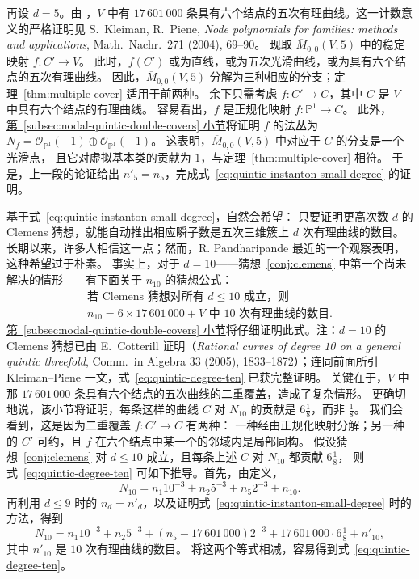 \begin{example}
再设 $d=5$。由 ，$V$ 中有 $17\,601\,000$ 条具有六个结点的五次有理曲线。这一计数意义的严格证明见 S.~Kleiman, R.~Piene, \emph{Node polynomials for families: methods and applications}, Math.\ Nachr.\ 271 (2004), 69--90。
现取 $\overline M_{0,0}(V,5)$ 中的稳定映射 $f:C'\to V$。
此时，$f(C')$ 或为直线，或为五次光滑曲线，或为具有六个结点的五次有理曲线。
因此，$\overline M_{0,0}(V,5)$ 分解为三种相应的分支；定理~\ref{thm:multiple-cover} 适用于前两种。
余下只需考虑 $f:C'\to C$，其中 $C$ 是 $V$ 中具有六个结点的有理曲线。
容易看出，$f$ 是正规化映射 $f:\mathbb P^1\to C$。
此外，\hyperref[subsec:nodal-quintic-double-covers]{第~\ref*{subsec:nodal-quintic-double-covers} 小节}将证明 $f$ 的法丛为
$N_f=\mathcal O_{\mathbb P^1}(-1)\oplus\mathcal O_{\mathbb P^1}(-1)$。
这表明，$\overline M_{0,0}(V,5)$ 中对应于 $C$ 的分支是一个光滑点，
且它对虚拟基本类的贡献为 $1$，与定理~\ref{thm:multiple-cover} 相符。
于是，上一段的论证给出 $n'_5=n_5$，完成式~\eqref{eq:quintic-instanton-small-degree} 的证明。

基于式~\eqref{eq:quintic-instanton-small-degree}，自然会希望：
只要证明更高次数 $d$ 的 Clemens 猜想，就能自动推出相应瞬子数是五次三维簇上 $d$ 次有理曲线的数目。
长期以来，许多人相信这一点；然而，R. Pandharipande 最近的一个观察表明，这种希望过于朴素。
事实上，对于 $d=10$——猜想~\ref{conj:clemens} 中第一个尚未解决的情形——有下面关于 $n_{10}$ 的猜想公式：
\begin{equation}\label{eq:quintic-degree-ten}
\begin{gathered}
\text{若 Clemens 猜想对所有 }d\leq10\text{ 成立，则}\\
n_{10}=6\times17\,601\,000+V\text{ 中 }10\text{ 次有理曲线的数目}.
\end{gathered}
\end{equation}
\hyperref[subsec:nodal-quintic-double-covers]{第~\ref*{subsec:nodal-quintic-double-covers} 小节}将仔细证明此式。注：$d=10$ 的 Clemens 猜想已由 E.~Cotterill 证明（\emph{Rational curves of degree 10 on a general quintic threefold}, Comm.\ in Algebra 33 (2005), 1833--1872）；连同前面所引 Kleiman--Piene 一文，式~\eqref{eq:quintic-degree-ten} 已获完整证明。
关键在于，$V$ 中那 $17\,601\,000$ 条具有六个结点的五次曲线的二重覆盖，造成了复杂情形。
更确切地说，该小节将证明，每条这样的曲线 $C$ 对 $N_{10}$ 的贡献是 $6\tfrac18$，而非 $\tfrac18$。
我们会看到，这是因为二重覆盖 $f:C'\to C$ 有两种：
一种经由正规化映射分解；另一种的 $C'$ 可约，且 $f$ 在六个结点中某一个的邻域内是局部同构。
假设猜想~\ref{conj:clemens} 对 $d\leq10$ 成立，且每条上述 $C$ 对 $N_{10}$ 都贡献 $6\tfrac18$，
则式~\eqref{eq:quintic-degree-ten} 可如下推导。首先，由定义，
\[
N_{10}=n_1 10^{-3}+n_2 5^{-3}+n_5 2^{-3}+n_{10}.
\]
再利用 $d\leq9$ 时的 $n_d=n'_d$，以及证明式~\eqref{eq:quintic-instanton-small-degree} 时的方法，得到
\[
N_{10}=n_1 10^{-3}+n_2 5^{-3}+(n_5-17\,601\,000)2^{-3}
+17\,601\,000\cdot6\tfrac18+n'_{10},
\]
其中 $n'_{10}$ 是 $10$ 次有理曲线的数目。
将这两个等式相减，容易得到式~\eqref{eq:quintic-degree-ten}。
\end{example}


